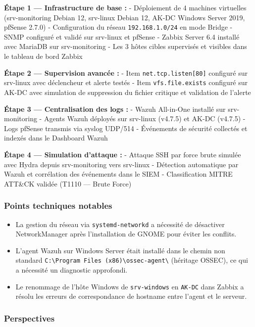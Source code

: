 \textbf{Étape 1 --- Infrastructure de base :} - Déploiement de 4
machines virtuelles (srv-monitoring Debian 12, srv-linux Debian 12,
AK-DC Windows Server 2019, pfSense 2.7.0) - Configuration du réseau
\texttt{192.168.1.0/24} en mode Bridge - SNMP configuré et validé sur
srv-linux et pfSense - Zabbix Server 6.4 installé avec MariaDB sur
srv-monitoring - Les 3 hôtes cibles supervisés et visibles dans le
tableau de bord Zabbix

\textbf{Étape 2 --- Supervision avancée :} - Item
\texttt{net.tcp.listen{[}80{]}} configuré sur srv-linux avec déclencheur
et alerte testés - Item \texttt{vfs.file.exists} configuré sur AK-DC
avec simulation de suppression du fichier critique et validation de
l'alerte

\textbf{Étape 3 --- Centralisation des logs :} - Wazuh All-in-One
installé sur srv-monitoring - Agents Wazuh déployés sur srv-linux
(v4.7.5) et AK-DC (v4.7.5) - Logs pfSense transmis via syslog UDP/514 -
Événements de sécurité collectés et indexés dans le Dashboard Wazuh

\textbf{Étape 4 --- Simulation d'attaque :} - Attaque SSH par force
brute simulée avec Hydra depuis srv-monitoring vers srv-linux -
Détection automatique par Wazuh et corrélation des événements dans le
SIEM - Classification MITRE ATT\&CK validée (T1110 --- Brute Force)

\subsubsection{Points techniques
notables}\label{points-techniques-notables}

\begin{itemize}
\tightlist
\item
  La gestion du réseau via \texttt{systemd-networkd} a nécessité de
  désactiver NetworkManager après l'installation de GNOME pour éviter
  les conflits.
\item
  L'agent Wazuh sur Windows Server était installé dans le chemin non
  standard
  \texttt{C:\textbackslash{}Program\ Files\ (x86)\textbackslash{}ossec-agent\textbackslash{}}
  (héritage OSSEC), ce qui a nécessité un diagnostic approfondi.
\item
  Le renommage de l'hôte Windows de \texttt{srv-windows} en
  \texttt{AK-DC} dans Zabbix a résolu les erreurs de correspondance de
  hostname entre l'agent et le serveur.
\end{itemize}

\subsubsection{Perspectives}\label{perspectives}

